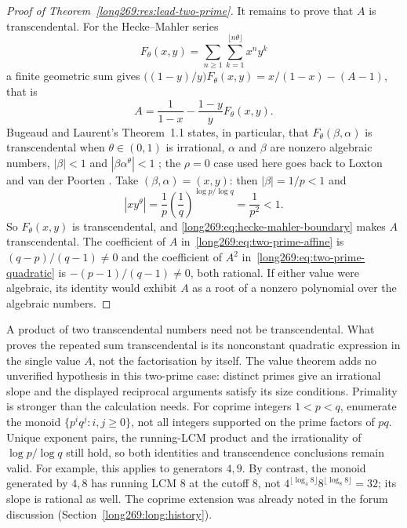 \begin{proof}[Proof of Theorem~\ref{long269:res:lead-two-prime}]
It remains to prove that $A$ is transcendental.  For the Hecke--Mahler series
\[
 F_\theta(x,y)=\sum_{n\ge1}\sum_{k=1}^{\lfloor n\theta\rfloor}x^ny^k
\]
a finite geometric sum gives
$\bigl((1-y)/y\bigr)F_\theta(x,y)=x/(1-x)-(A-1)$, that is
\begin{equation}\label{long269:eq:hecke-mahler-boundary}
 A=\frac1{1-x}-\frac{1-y}{y}F_\theta(x,y).
\end{equation}
Bugeaud and Laurent's Theorem~1.1 states, in particular, that
$F_\theta(\beta,\alpha)$ is transcendental when $\theta\in(0,1)$ is irrational,
$\alpha$ and $\beta$ are nonzero algebraic numbers, $|\beta|<1$ and
$|\beta\alpha^\theta|<1$ \cite[Theorem~1.1]{bugeaudlaurent2023}; the
$\rho=0$ case used here goes back to Loxton and van der Poorten
\cite[Theorem~8, p.~40]{loxtonvdp1977}.  Take $(\beta,\alpha)=(x,y)$: then
$|\beta|=1/p<1$ and
\[
 |xy^{\theta}|=\frac1p\left(\frac1q\right)^{\log p/\log q}=\frac1{p^{2}}<1 .
\]
So $F_\theta(x,y)$ is transcendental, and \eqref{long269:eq:hecke-mahler-boundary}
makes $A$ transcendental.  The coefficient of $A$
in~\eqref{long269:eq:two-prime-affine} is $(q-p)/(q-1)\ne0$ and the coefficient of
$A^{2}$ in~\eqref{long269:eq:two-prime-quadratic} is $-(p-1)/(q-1)\ne0$, both rational.
If either value were algebraic, its identity would exhibit $A$ as a root of a
nonzero polynomial over the algebraic numbers.
\end{proof}

\label{long269:res:two-prime-transcendence}\label{long269:res:two-prime-repeated-transcendence}
A product of two transcendental numbers need not be transcendental.
What proves the repeated sum transcendental is its nonconstant quadratic
expression in the single value $A$, not the factorisation by itself.
The value theorem adds no unverified hypothesis in this two-prime case:
distinct primes give an irrational slope and the displayed reciprocal
arguments satisfy its size conditions.  Primality is stronger than the
calculation needs.  For coprime integers $1<p<q$, enumerate the monoid
$\{p^iq^j:i,j\ge0\}$, not all integers supported on the prime factors of
$pq$.  Unique exponent pairs, the running-LCM product and the irrationality
of $\log p/\log q$ still hold, so both identities and transcendence
conclusions remain valid.  For example, this applies to generators $4,9$.
By contrast, the monoid generated by $4,8$ has running LCM $8$ at the
cutoff $8$, not $4^{\lfloor\log_4 8\rfloor}8^{\lfloor\log_8 8\rfloor}=32$;
its slope is rational as well.  The coprime extension was already noted
in the forum discussion (Section~\ref{long269:long:history}).

